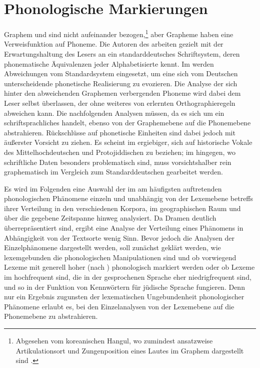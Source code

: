 \chapter{Phonologische Markierungen}\label{phonologie}
Graphem und  sind nicht  aufeinander bezogen,\footnote{Abgesehen vom koreanischen Hangul, wo zumindest ansatzweise Artikulationsort und Zungenposition eines Lautes im Graphem dargestellt sind \parencite[32]{Sampson1985}.} aber Grapheme haben eine Verweisfunktion auf Phoneme. Die Autoren des  arbeiten gezielt mit der Erwartungshaltung des Lesers an ein standarddeutsches Schriftsystem, deren phonematische Äquivalenzen jeder Alphabetisierte kennt. Im  werden Abweichungen vom Standardsystem eingesetzt, um eine sich vom Deutschen unterscheidende phonetische Realisierung zu evozieren. Die Analyse der sich hinter den abweichenden Graphemen verbergenden Phoneme wird dabei dem Leser selbst überlassen, der ohne weiteres von erlernten Orthographieregeln abweichen kann. Die nachfolgenden Analysen müssen, da es sich um ein schriftsprachliches  handelt, ebenso von der Graphemebene auf die Phonemebene abstrahieren. Rückschlüsse auf phonetische Einheiten sind dabei jedoch mit äußerster Vorsicht zu ziehen. Es scheint im  ergiebiger, sich auf historische Vokale des Mittelhochdeutschen und Protojiddischen zu beziehen; im  hingegen, wo schriftliche Daten besonders problematisch sind, muss vorsichtshalber rein graphematisch im Vergleich zum Standarddeutschen gearbeitet werden.
 
 Es wird im Folgenden eine Auswahl der im  am häufigsten auftretenden phonologischen Phänomene einzeln und unabhängig von der Lexemebene betreffs ihrer Verteilung in den verschiedenen Korpora, im geographischen Raum und über die gegebene Zeitspanne hinweg analysiert. Da Dramen deutlich überrepräsentiert sind, ergibt eine Analyse der Verteilung eines Phänomens in Abhängigkeit von der Textsorte wenig Sinn. Bevor jedoch die Analysen der Einzelphänomene dargestellt werden, soll zunächst geklärt werden, wie lexemgebunden die phonologischen Manipulationen sind und ob vorwiegend Lexeme mit generell hoher  (nach \cite{Ruoff1981}) phonologisch markiert werden oder ob Lexeme im  hochfrequent sind, die in der gesprochenen Sprache eher niedrigfrequent sind, und so in der Funktion von Kennwörtern für jüdische Sprache fungieren. Denn nur ein Ergebnis zugunsten der lexematischen Ungebundenheit phonologischer Phänomene erlaubt es, bei den Einzelanalysen von der Lexemebene auf die Phonemebene zu abstrahieren.

